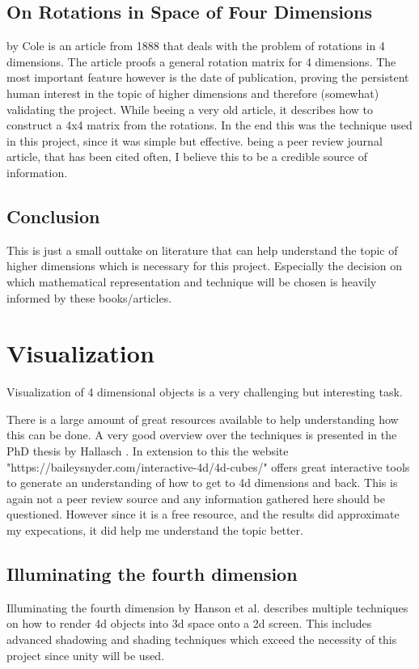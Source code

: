 \documentclass{article}
\begin{document}
\subsection{On Rotations in Space of Four Dimensions} by Cole \cite{rot_n_1} is an article from 1888 that deals with the problem of rotations in 4 dimensions. The article proofs a general rotation matrix for 4 dimensions. The most important feature however is the date of publication, proving the persistent human interest in the topic of higher dimensions and therefore (somewhat) validating the project.
\newline
While beeing a very old article, it describes how to construct a 4x4 matrix from the rotations. In the end this was the technique used in this project, since it was simple but effective. being a peer review journal article, that has been cited often, I believe this to be a credible source of information.

\subsection{Conclusion}
This is just a small outtake on literature that can help understand the topic of higher dimensions which is necessary for this project. Especially the decision on which mathematical representation and technique will be chosen is heavily informed by these books/articles.

\section{Visualization}
Visualization of 4 dimensional objects is a very challenging but interesting task.

There is a large amount of great resources available to help understanding how this can be done. A very good overview over the techniques is presented in the PhD thesis by Hallasch \cite{4d_vis_1}. In extension to this the website "https://baileysnyder.com/interactive-4d/4d-cubes/" \cite{4d_vis_2} offers great interactive tools to generate an understanding of how to get to 4d dimensions and back.
This is again not a peer review source and any information gathered here should be questioned. However since it is a free resource, and the results did approximate my expecations, it did help me understand the topic better.
\subsection{Illuminating the fourth dimension} Illuminating the fourth dimension by Hanson et al. \cite{4d_vis_3} describes multiple techniques on how to render 4d objects into 3d space onto a 2d screen. This includes advanced shadowing and shading techniques which exceed the necessity of this project since unity will be used.
\newpage
\end{document}
